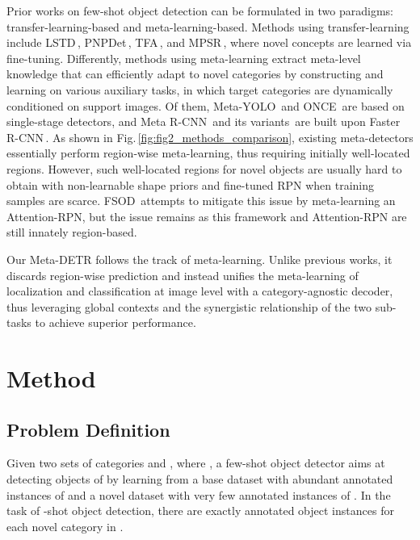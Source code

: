 \documentclass[10pt,twocolumn,letterpaper]{article}
\begin{document}
\smallskip
{}
Prior works on few-shot object detection can be formulated in two paradigms: transfer-learning-based and meta-learning-based. Methods using transfer-learning include LSTD\,\cite{LSTD}, PNPDet\,\cite{PNPDet}, TFA\,\cite{fsdet}, and MPSR\,\cite{MPSR}, where novel concepts are learned via fine-tuning. Differently, methods using meta-learning extract meta-level knowledge that can efficiently adapt to novel categories by constructing and learning on various auxiliary tasks, in which target categories are dynamically conditioned on support images. Of them, Meta-YOLO\,\cite{FewshotReweighting} and ONCE\,\cite{incrementalfsdet} are based on single-stage detectors, and Meta R-CNN\,\cite{metarcnn} and its variants\,\cite{metarcnn_acmmm,metadet,FSOD-KT,mmfsod,FSDetView,AFDNet} are built upon Faster R-CNN\,\cite{FasterRCNN}.
As shown in Fig.\,\ref{fig:fig2_methods_comparison}, existing meta-detectors essentially perform region-wise meta-learning, thus requiring initially well-located regions. However, such well-located regions for novel objects are usually hard to obtain with non-learnable shape priors and fine-tuned RPN when training samples are scarce.
FSOD\,\cite{fsod} attempts to mitigate this issue by meta-learning an Attention-RPN, but the issue remains as this framework and Attention-RPN are still innately region-based.

Our Meta-DETR follows the track of meta-learning. Unlike previous works, it discards region-wise prediction and instead unifies the meta-learning of localization and classification at image level with a category-agnostic decoder, thus leveraging global contexts and the synergistic relationship of the two sub-tasks to achieve superior performance.



\section{Method}

\subsection{Problem Definition}
\vspace*{-0.5mm}
Given two sets of categories  and , where , a few-shot object detector aims at detecting objects of  by learning from a base dataset  with abundant annotated instances of  and a novel dataset  with very few annotated instances of .
In the task of -shot object detection, there are exactly  annotated object instances for each novel category in .
\end{document}
